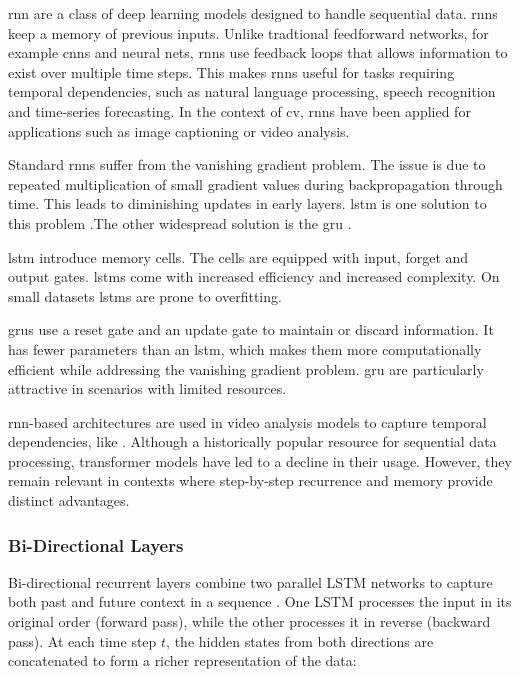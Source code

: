 \acrfull{rnn} are a class of deep learning models designed to handle sequential data. \acrshort{rnn}s keep a memory of previous inputs. Unlike tradtional feedforward networks, for example \acrshort{cnn}s and neural nets, \acrshort{rnn}s use feedback loops that allows information to exist over multiple time steps.  This makes \acrshort{rnn}s useful for tasks requiring temporal dependencies, such as natural language processing, speech recognition and time-series forecasting\cite{ibm_rnn_2025}. In the context of \acrfull{cv}, \acrshort{rnn}s have been applied for applications such as image captioning or video analysis. 

Standard \acrshort{rnn}s suffer from the vanishing gradient problem. The issue is due to repeated multiplication of small gradient values during backpropagation through time. This leads to diminishing updates in early layers. \acrfull{lstm} is one solution to this problem \cite{bhogal_human_2023, kumar_human_2023, mahaseni_spotting_2021}.The other widespread solution is the \acrfull{gru} \cite{giveki_human_2024,li_oarnet_2024,yu_i3d_2023}. 

\acrlong{lstm} introduce memory cells. The cells are equipped with input, forget and output gates. \acrshort{lstm}s come with increased efficiency and increased complexity. On small datasets \acrshort{lstm}s are prone to overfitting. 

\acrlong{gru}s use a reset gate and an update gate to maintain or discard information. It has fewer parameters than an \acrshort{lstm}, which makes them more computationally efficient while addressing the vanishing gradient problem. \acrshort{gru} are particularly attractive in scenarios with limited resources. 

\acrshort{rnn}-based architectures are used in video analysis models to capture temporal dependencies, like \textcite{bhogal_human_2023}. Although a historically popular resource for sequential data processing, transformer models have led to a decline in their usage. However, they remain relevant in contexts where step-by-step recurrence and memory provide distinct advantages\cite{ibm_rnn_2025}.

\subsubsection{Bi-Directional Layers}
\label{ssec:bi_directional_layers}

Bi-directional recurrent layers combine two parallel LSTM networks to capture both past and future context in a sequence \cite{radhakrishnan_bi_lstm_2023, bhogal_human_2023}. One LSTM processes the input in its original order (forward pass), while the other processes it in reverse (backward pass). At each time step \(t\), the hidden states from both directions are concatenated to form a richer representation of the data:

